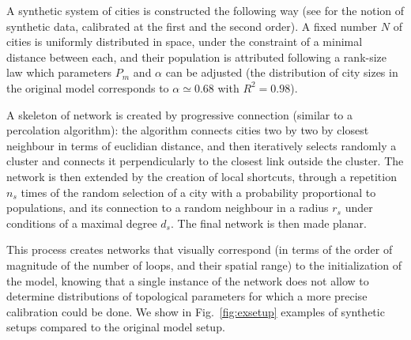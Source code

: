 \documentclass[graybox]{svmult}
\begin{document}
A synthetic system of cities is constructed the following way (see \cite{raimbault2016generation} for the notion of synthetic data, calibrated at the first and the second order). A fixed number $N$ of cities is uniformly distributed in space, under the constraint of a minimal distance between each, and their population is attributed following a rank-size law which parameters $P_{m}$ and $\alpha$ can be adjusted (the distribution of city sizes in the original model corresponds to $\alpha\simeq 0.68$ with $R^2=0.98$).

A skeleton of network is created by progressive connection (similar to a percolation algorithm): the algorithm connects cities two by two by closest neighbour in terms of euclidian distance, and then iteratively selects randomly a cluster and connects it perpendicularly to the closest link outside the cluster. The network is then extended by the creation of local shortcuts, through a repetition $n_s$ times of the random selection of a city with a probability proportional to populations, and its connection to a random neighbour in a radius $r_s$ under conditions of a maximal degree $d_s$. The final network is then made planar.


This process creates networks that visually correspond (in terms of the order of magnitude of the number of loops, and their spatial range) to the initialization of the model, knowing that a single instance of the network does not allow to determine distributions of topological parameters for which a more precise calibration could be done. We show in Fig.~\ref{fig:exsetup} examples of synthetic setups compared to the original model setup.
\end{document}

